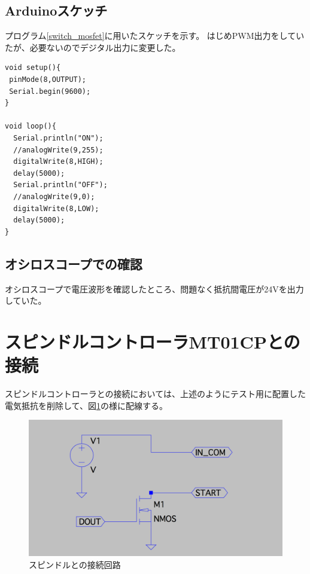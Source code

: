 \documentclass[]{jsarticle}
\begin{document}
\subsection{Arduinoスケッチ}
プログラム\ref{switch_mosfet}に用いたスケッチを示す。
はじめPWM出力をしていたが、必要ないのでデジタル出力に変更した。
\begin{lstlisting}[caption=MOSFET駆動スケッチ,label=switch_mosfet]
void setup(){
 pinMode(8,OUTPUT); 
 Serial.begin(9600);
}

void loop(){
  Serial.println("ON");
  //analogWrite(9,255);
  digitalWrite(8,HIGH);
  delay(5000);
  Serial.println("OFF");
  //analogWrite(9,0);
  digitalWrite(8,LOW);
  delay(5000);  
}
\end{lstlisting}

\subsection{オシロスコープでの確認}
オシロスコープで電圧波形を確認したところ、問題なく抵抗間電圧が24Vを出力していた。

\section{スピンドルコントローラMT01CPとの接続}
スピンドルコントローラとの接続においては、上述のようにテスト用に配置した電気抵抗を削除して、図\ref{controller}の様に配線する。
\begin{figure}[htbp]
\centering
\includegraphics[width=130mm]{./image/controller.pdf}
\caption{スピンドルとの接続回路}
\label{controller}
\end{figure}
\end{document}

